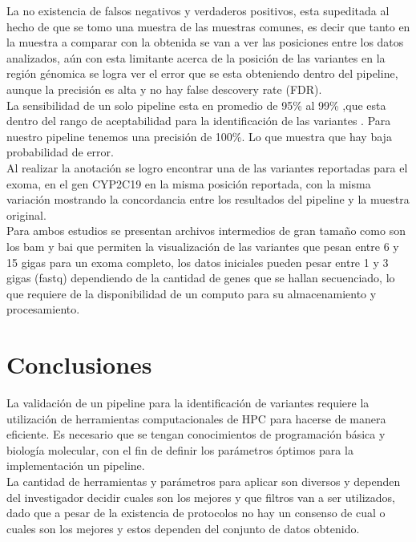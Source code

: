 La no existencia de falsos negativos y verdaderos positivos, esta supeditada al hecho de que se tomo una muestra de las muestras comunes, es decir que tanto en la muestra a comparar con la obtenida se van a ver las posiciones entre los datos analizados, aún con esta limitante acerca de la posición de las variantes en la región génomica se logra ver el error que se esta obteniendo dentro del pipeline, aunque la precisión es alta y no hay false descovery rate (FDR).\\

La sensibilidad de un solo pipeline esta en promedio de 95\% al 99\% ,que esta dentro del rango de aceptabilidad para la identificación de las variantes \cite{Liu2013}. Para nuestro pipeline tenemos una precisión de 100\%. Lo que muestra que hay baja probabilidad de error.\\

Al realizar la anotación se logro encontrar una de las variantes reportadas para el exoma, en el gen CYP2C19 en la misma posición reportada, con la misma variación mostrando la concordancia entre los resultados del pipeline y la muestra original. \\

Para ambos estudios se presentan archivos intermedios de gran tamaño como son los bam y bai que permiten la visualización de las variantes que pesan entre 6 y 15 gigas para un exoma completo, los datos iniciales pueden pesar entre 1 y 3 gigas (fastq) dependiendo de la cantidad de genes que se hallan secuenciado, lo que requiere de la disponibilidad de un computo para su almacenamiento y procesamiento. 

\section{Conclusiones}

La validación de un pipeline para la identificación de variantes requiere la utilización de herramientas computacionales de HPC para hacerse de manera eficiente. Es necesario que se tengan conocimientos de programación básica y biología molecular, con el fin de definir los parámetros óptimos para la implementación un pipeline.\\ 

La cantidad de herramientas y parámetros para aplicar son diversos y dependen del investigador decidir cuales son los mejores y que filtros van a ser utilizados, dado que a pesar de la existencia de protocolos no hay un consenso de cual o cuales son los mejores y estos dependen del conjunto de datos obtenido. \\ 

